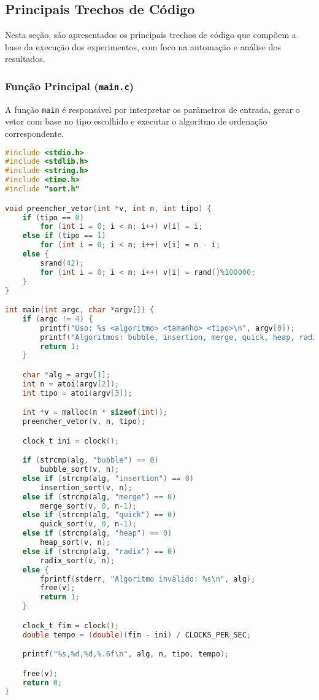 \subsection{Principais Trechos de Código}

Nesta seção, são apresentados os principais trechos de código que compõem a base da execução dos experimentos, com foco na automação e análise dos resultados.

\subsubsection{Função Principal (\texttt{main.c})}

A função \texttt{main} é responsável por interpretar os parâmetros de entrada, gerar o vetor com base no tipo escolhido e executar o algoritmo de ordenação correspondente.

\begin{lstlisting}[language=C, caption={Função principal com medição de tempo}, label={lst:main}]
#include <stdio.h>
#include <stdlib.h>
#include <string.h>
#include <time.h>
#include "sort.h"

void preencher_vetor(int *v, int n, int tipo) {
    if (tipo == 0)
        for (int i = 0; i < n; i++) v[i] = i;
    else if (tipo == 1)
        for (int i = 0; i < n; i++) v[i] = n - i;
    else {
        srand(42);
        for (int i = 0; i < n; i++) v[i] = rand()%100000;
    }
}

int main(int argc, char *argv[]) {
    if (argc != 4) {
        printf("Uso: %s <algoritmo> <tamanho> <tipo>\n", argv[0]);
        printf("Algoritmos: bubble, insertion, merge, quick, heap, radix\n");
        return 1;
    }

    char *alg = argv[1];
    int n = atoi(argv[2]);
    int tipo = atoi(argv[3]);

    int *v = malloc(n * sizeof(int));
    preencher_vetor(v, n, tipo);

    clock_t ini = clock();

    if (strcmp(alg, "bubble") == 0)
        bubble_sort(v, n);
    else if (strcmp(alg, "insertion") == 0)
        insertion_sort(v, n);
    else if (strcmp(alg, "merge") == 0)
        merge_sort(v, 0, n-1);
    else if (strcmp(alg, "quick") == 0)
        quick_sort(v, 0, n-1);
    else if (strcmp(alg, "heap") == 0)
        heap_sort(v, n);
    else if (strcmp(alg, "radix") == 0)
        radix_sort(v, n);
    else {
        fprintf(stderr, "Algoritmo inválido: %s\n", alg);
        free(v);
        return 1;
    }

    clock_t fim = clock();
    double tempo = (double)(fim - ini) / CLOCKS_PER_SEC;

    printf("%s,%d,%d,%.6f\n", alg, n, tipo, tempo);

    free(v);
    return 0;
}
\end{lstlisting}

